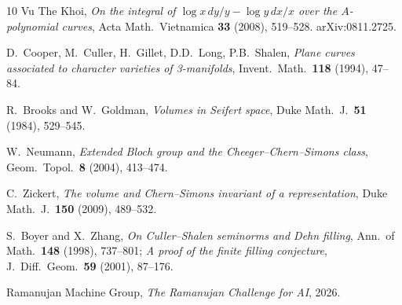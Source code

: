 \documentclass[11pt]{article}
\theoremstyle{remark}
\begin{document}
\begin{thebibliography}{10}
Vu The Khoi,
\emph{On the integral of $\log x\,dy/y - \log y\,dx/x$ over
the $A$-polynomial curves},
Acta Math.\ Vietnamica \textbf{33} (2008), 519--528.
arXiv:0811.2725.

D.~Cooper, M.~Culler, H.~Gillet, D.D.~Long, P.B.~Shalen,
\emph{Plane curves associated to character varieties of
3-manifolds},
Invent.\ Math.\ \textbf{118} (1994), 47--84.

R.~Brooks and W.~Goldman,
\emph{Volumes in Seifert space},
Duke Math.\ J.\ \textbf{51} (1984), 529--545.

W.~Neumann,
\emph{Extended Bloch group and the Cheeger--Chern--Simons class},
Geom.\ Topol.\ \textbf{8} (2004), 413--474.

C.~Zickert,
\emph{The volume and Chern--Simons invariant of a representation},
Duke Math.\ J.\ \textbf{150} (2009), 489--532.

S.~Boyer and X.~Zhang,
\emph{On Culler--Shalen seminorms and Dehn filling},
Ann.\ of Math.\ \textbf{148} (1998), 737--801;
\emph{A proof of the finite filling conjecture},
J.\ Diff.\ Geom.\ \textbf{59} (2001), 87--176.

Ramanujan Machine Group,
\emph{The Ramanujan Challenge for AI}, 2026.
\end{thebibliography}
\end{document}
